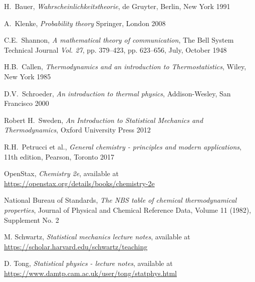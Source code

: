 \documentclass[a4paper, draft]{article}
\theoremstyle{own}
\theoremstyle{remark}
\begin{document}
\begin{thebibliography}{9}
	
H.~Bauer,
{\em Wahrscheinlichkeitstheorie},
de Gruyter, Berlin, New York 1991
	
A.~Klenke,
{\em Probability theory}
Springer, London 2008


C.E.~Shannon,
{\em A mathematical theory of communication}, 
The Bell System Technical Journal {\em Vol. 27}, pp. 379--423, pp. 623--656, July, October 1948



H.B.~Callen,
{\em Thermodynamics and an introduction to Thermostatistics},
Wiley, New York 1985


D.V.~Schroeder,
{\em An introduction to thermal physics},
Addison-Wesley, San Francisco 2000

Robert H.~Sweden,
{\em An Introduction to Statistical Mechanics and Thermodynamics}, Oxford University Press 2012

R.H.~Petrucci et al., 
{\em General chemistry - principles and modern applications}, 11th edition, Pearson, Toronto 2017

OpenStax, {\em Chemistry 2e}, available at \url{https://openstax.org/details/books/chemistry-2e}

National Bureau of Standards, {\em The NBS table of chemical thermodynamical properties}, Journal of Physical and Chemical Reference Data, Volume 11 (1982), Supplement No. 2

M. Schwartz, {\em Statistical mechanics lecture notes}, available at \url{https://scholar.harvard.edu/schwartz/teaching}	

D. Tong, {\em Statistical physics - lecture notes}, available at \url{https://www.damtp.cam.ac.uk/user/tong/statphys.html}

\end{thebibliography}
\end{document}
